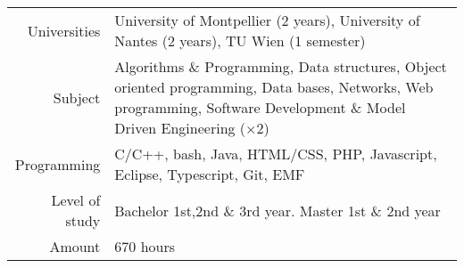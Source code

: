 \begin{tabular}{r @{~$\rangle$~} p{}}

Universities & University of Montpellier (2 years), University of Nantes (2 years), TU Wien (1 semester) \\

Subject  & Algorithms \& Programming, Data structures, Object oriented programming, Data bases, Networks, Web programming, Software Development \& Model Driven Engineering ($\times 2$) \\

Programming & C/C++, bash, Java, HTML/CSS, PHP, Javascript, Eclipse, Typescript, Git, EMF\\

Level of study & Bachelor 1st,2nd \& 3rd year. Master 1st \& 2nd year \\

Amount & $670$ hours \\

\end{tabular}